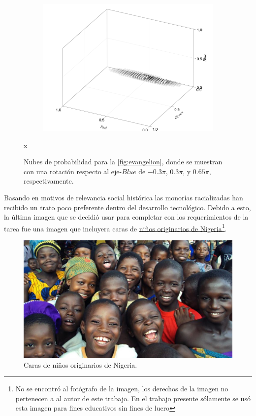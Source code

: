 \begin{figure}[ht!]
\begin{subfigure}[c]{0.3\textwidth}
    \end{subfigure}
    \begin{subfigure}[c]{0.3\textwidth}
        \centering
        \includegraphics[scale=0.09]{../figures/gaussian_cloud_eva_3}
    \end{subfigure}
    \caption{Nubes de probabilidad para la \cref{fig:evangelion}, donde se muestran con una rotación respecto al eje-$Blue$ de $-0.3\pi$, $0.3\pi$, y $0.65\pi$, respectivamente.}x
    \label{fig:nube-gaussiana-eva}
\end{figure}

Basando en motivos de relevancia social histórica las monorías racializadas \cite{wevers2016kodak} han recibido un trato poco preferente dentro del desarrollo tecnológico. Debido a esto, la última imagen que se decidió usar para completar con los requerimientos de la tarea fue una imagen que incluyera caras de \href{https://guardian.ng/opinion/humanism-and-its-possibilities-in-africa/}{niños originarios de Nigeria}\footnote{No se encontró al fotógrafo de la imagen, los derechos de la imagen no pertenecen a al autor de este trabajo. En el trabajo presente sólamente se usó esta imagen para fines educativos sin fines de lucro}.
\begin{figure}[ht!]
    \centering
    \includegraphics[scale=0.25]{../figures/nigerian-children}
    \caption{Caras de niños originarios de Nigeria.}
    \label{fig:kids}
\end{figure}

